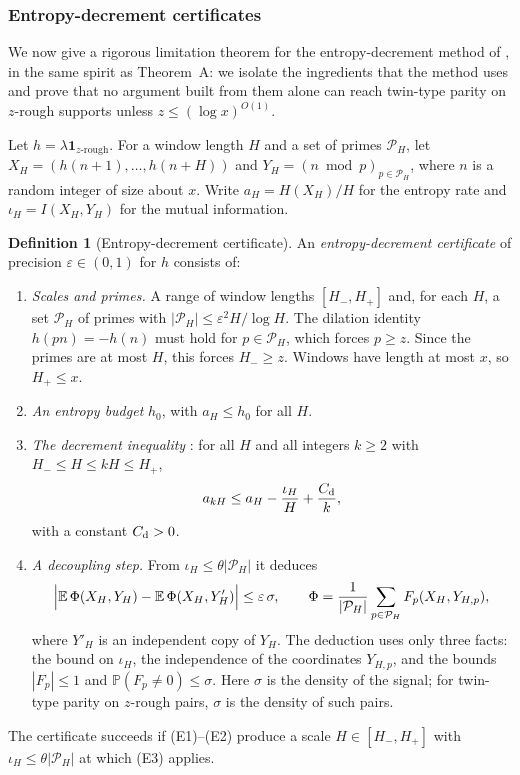 \documentclass[11pt]{amsart}
\theoremstyle{definition}
\newtheorem{definition}[theorem]{Definition}
\theoremstyle{remark}
\begin{document}
\subsubsection*{Entropy-decrement certificates}
We now give a rigorous limitation theorem for the entropy-decrement method of \cite[\S3]{Tao16}, in the same spirit as Theorem~A: we isolate the ingredients that the method uses and prove that no argument built from them alone can reach twin-type parity on $z$-rough supports unless $z\le(\log x)^{O(1)}$.

Let $h=\lambda\mathbf 1_{z\text{-rough}}$. For a window length $H$ and a set of primes $\mathcal P_H$, let $X_H=(h(n+1),\dots,h(n+H))$ and $Y_H=(n\bmod p)_{p\in\mathcal P_H}$, where $n$ is a random integer of size about $x$. Write $a_H=H(X_H)/H$ for the entropy rate and $\iota_H=I(X_H,Y_H)$ for the mutual information.

\begin{definition}[Entropy-decrement certificate]\label{def:edc}
An \emph{entropy-decrement certificate} of precision $\varepsilon\in(0,1)$ for $h$ consists of:
\begin{enumerate}
\item[(E0)] \emph{Scales and primes.} A range of window lengths $[H_-,H_+]$ and, for each $H$, a set $\mathcal P_H$ of primes with $|\mathcal P_H|\le\varepsilon^2H/\log H$. The dilation identity $h(pn)=-h(n)$ must hold for $p\in\mathcal P_H$, which forces $p\ge z$. Since the primes are at most $H$, this forces $H_-\ge z$. Windows have length at most $x$, so $H_+\le x$.
\item[(E1)] \emph{An entropy budget} $h_0$, with $a_H\le h_0$ for all $H$.
\item[(E2)] \emph{The decrement inequality} \cite[(3.12)]{Tao16}: for all $H$ and all integers $k\ge2$ with $H_-\le H\le kH\le H_+$,
\[
a_{kH}\le a_H-\frac{\iota_H}{H}+\frac{C_{\rm d}}{k},
\]
with a constant $C_{\rm d}>0$.
\item[(E3)] \emph{A decoupling step.} From $\iota_H\le\theta|\mathcal P_H|$ it deduces
\[
\Bigl|\mathbb E\,\Phi(X_H,Y_H)-\mathbb E\,\Phi(X_H,Y_H')\Bigr|\le\varepsilon\,\sigma,\qquad \Phi=\frac1{|\mathcal P_H|}\sum_{p\in\mathcal P_H}F_p(X_H,Y_{H,p}),
\]
where $Y'_H$ is an independent copy of $Y_H$. The deduction uses only three facts: the bound on $\iota_H$, the independence of the coordinates $Y_{H,p}$, and the bounds $|F_p|\le1$ and $\mathbb P(F_p\ne0)\le\sigma$. Here $\sigma$ is the density of the signal; for twin-type parity on $z$-rough pairs, $\sigma$ is the density of such pairs.
\end{enumerate}
The certificate succeeds if (E1)--(E2) produce a scale $H\in[H_-,H_+]$ with $\iota_H\le\theta|\mathcal P_H|$ at which (E3) applies.
\end{definition}
\end{document}
